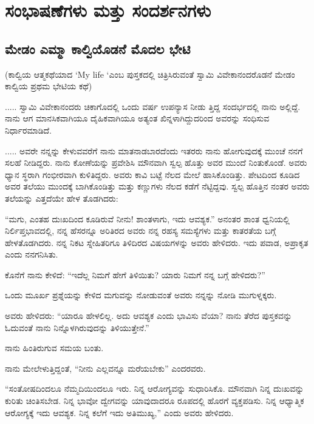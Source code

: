 

\part{ಸಂಭಾಷಣೆಗಳು ಮತ್ತು ಸಂದರ್ಶನಗಳು}

\chapter{ಮೇಡಂ ಎಮ್ಮಾ ಕಾಲ್ವಿಯೊಡನೆ ಮೊದಲ ಭೇಟಿ}

(ಕಾಲ್ವಿಯ ಆತ್ಮಕಥೆಯಾದ ‘My life ‘ಎಂಬ ಪುಸ್ತಕದಲ್ಲಿ ಚಿತ್ರಿಸಿರುವಂತೆ ಸ್ವಾಮಿ ವಿವೇಕಾನಂದರೊಡನೆ ಮೇಡಂ ಕಾಲ್ವಿಯ ಪ್ರಥಮ ಭೇಟಿಯ ಕಥೆ)

..... ಸ್ವಾಮಿ ವಿವೇಕಾನಂದರು ಚಿಕಾಗೊದಲ್ಲಿ ಒಂದು ವರ್ಷ ಉಪನ್ಯಾಸ ನೀಡು ತ್ತಿದ್ದ ಸಂದರ್ಭದಲ್ಲಿ ನಾನು ಅಲ್ಲಿದ್ದೆ. ನಾನು ಆಗ ಮಾನಸಿಕವಾಗಿಯೂ ದೈಹಿಕವಾಗಿಯೂ ಅತ್ಯಂತ ಖಿನ್ನಳಾಗಿದ್ದುದರಿಂದ ಅವರನ್ನು ಸಂಧಿಸುವ ನಿರ್ಧಾರಮಾಡಿದೆ.

..... ಅವರೇ ನನ್ನನ್ನು ಕೇಳುವವರೆಗೆ ನಾನು ಮಾತನಾಡಬಾರದೆಂದು ಇತರರು ನಾನು ಹೋಗುವುದಕ್ಕೆ ಮುಂಚೆ ನನಗೆ ಸಲಹೆ ನೀಡಿದ್ದರು. ನಾನು ಕೋಣೆಯನ್ನು ಪ್ರವೇಶಿಸಿ ಮೌನವಾಗಿ ಸ್ವಲ್ಪ ಹೊತ್ತು ಅವರ ಮುಂದೆ ನಿಂತುಕೊಂಡೆ. ಅವರು ಧ್ಯಾನ ಸ್ಥರಾಗಿ ಗಂಭೀರವಾಗಿ ಕುಳಿತಿದ್ದರು. ಅವರು ಕಾವಿ ಬಟ್ಟೆ ನೆಲದ ಮೇಲೆ ಹಾಸಿಕೊಂಡಿತ್ತು. ಪೇಟದಿಂದ ಕೂಡಿದ ಅವರ ತಲೆಯು ಮುಂದಕ್ಕೆ ಬಾಗಿಕೊಂಡಿತ್ತು ಮತ್ತು ಕಣ್ಣುಗಳು ನೆಲದ ಕಡೆಗೆ ನೆಟ್ಟಿದ್ದವು. ಸ್ವಲ್ಪ ಹೊತ್ತಿನ ನಂತರ ಅವರು ತಲೆಯನ್ನು ಎತ್ತದೆಯೇ ಹೇಳ ತೊಡಗಿದರು:

“ಮಗು, ಎಂತಹ ದುಃಖದಿಂದ ಕೂಡಿರುವೆ ನೀನು! ಶಾಂತಳಾಗು, ಇದು ಆವಶ್ಯಕ.” ಅನಂತರ ಶಾಂತ ಧ್ವನಿಯಲ್ಲಿ ನಿರ್ಲಿಪ್ತಭಾವದಲ್ಲಿ, ನನ್ನ ಹೆಸರನ್ನೂ ಅರಿತಿರದ ಅವರು ನನ್ನ ರಹಸ್ಯ ಸಮಸ್ಯೆಗಳು ಮತ್ತು ಕಾತರತೆಯ ಬಗ್ಗೆ ಹೇಳತೊಡಗಿದರು. ನನ್ನ ನಿಕಟ ಸ್ನೇಹಿತರಿಗೂ ತಿಳಿದಿರದ ವಿಷಯಗಳನ್ನು ಅವರು ಹೇಳಿದರು. ಇದು ಪವಾಡ, ಅಪ್ರಾಕೃತ ಎಂದು ನನಗನಿಸಿತು.

ಕೊನೆಗೆ ನಾನು ಕೇಳಿದೆ: “ಇದೆಲ್ಲ ನಿಮಗೆ ಹೇಗೆ ತಿಳಿಯಿತು? ಯಾರು ನಿಮಗೆ ನನ್ನ ಬಗ್ಗೆ ಹೇಳಿದರು?”

ಒಂದು ಮೂರ್ಖ ಪ್ರಶ್ನೆಯನ್ನು ಕೇಳಿದ ಮಗುವನ್ನು ನೋಡುವಂತೆ ಅವರು ನನ್ನನ್ನು ನೋಡಿ ಮುಗುಳ್ನಕ್ಕರು.

ಅವರು ಹೇಳಿದರು: “ಯಾರೂ ಹೇಳಲಿಲ್ಲ. ಅದು ಆವಶ್ಯಕ ಎಂದು ಭಾವಿಸು ವೆಯಾ? ನಾನು ತೆರೆದ ಪುಸ್ತಕವನ್ನು ಓದುವಂತೆ ನಾನು ನಿನ್ನೊಳಗಿರುವುದನ್ನು ತಿಳಿಯುತ್ತೇನೆ.”

ನಾನು ಹಿಂತಿರುಗುವ ಸಮಯ ಬಂತು.

ನಾನು ಮೇಲೇಳುತ್ತಿದ್ದಂತೆ, “ನೀನು ಎಲ್ಲವನ್ನೂ ಮರೆಯಬೇಕು” ಎಂದರವರು.

“ಸಂತೋಷದಿಂದಲೂ ನೆಮ್ಮದಿಯಿಂದಲೂ ಇರು. ನಿನ್ನ ಆರೋಗ್ಯವನ್ನು ಸುಧಾರಿಸಿಕೊ. ಮೌನವಾಗಿ ನಿನ್ನ ದುಃಖವನ್ನು ಕುರಿತು ಚಿಂತಿಸಬೇಡ. ನಿನ್ನ ಭಾವೋ ದ್ವೇಗವನ್ನು ಯಾವುದಾದರೂ ರೂಪದಲ್ಲಿ ಹೊರಗೆ ವ್ಯಕ್ತಪಡಿಸು. ನಿನ್ನ ಆಧ್ಯಾತ್ಮಿಕ ಆರೋಗ್ಯಕ್ಕೆ ಇದು ಆವಶ್ಯಕ. ನಿನ್ನ ಕಲೆಗೆ ಇದು ಅತಿಮುಖ್ಯ,” ಎಂದು ಅವರು ಹೇಳಿದರು.

